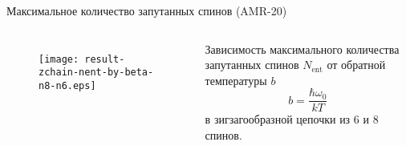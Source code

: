 \begin{frame}{Максимальное количество запутанных спинов (AMR-20)}
  \begin{columns}

     \begin{figure}
     \texttt{[image: result-zchain-nent-by-beta-n8-n6.eps]}
     \end{figure}

     Зависимость максимального количества запутанных спинов $N_\mathrm{ent}$ от обратной температуры $b$
     $$ b=\dfrac{\hbar\omega_0}{kT} $$
     в зигзагообразной цепочки из 6 и 8 спинов.

  \end{columns}
\end{frame}
